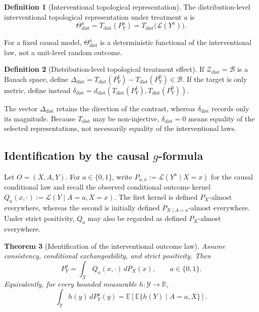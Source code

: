 \documentclass[11pt,a4paper]{article}
\theoremstyle{plain}
\newtheorem{theorem}{Theorem}[section]
\theoremstyle{definition}
\newtheorem{definition}[theorem]{Definition}
\theoremstyle{remark}
\newcommand{\1}{\mathbbm{1}}
\begin{document}
\begin{definition}[Interventional topological representation]
\label{def:interventional-topological-representation}
The distribution-level interventional topological representation under treatment \(a\) is
\[
\Theta_{\mathrm{dist}}^a
=
T_{\mathrm{dist}}(P_Y^a)
=
T_{\mathrm{dist}}\bigl(\mathcal L(Y^a)\bigr).
\]
\end{definition}

For a fixed causal model, \(\Theta_{\mathrm{dist}}^a\) is a deterministic functional of the interventional law, not a unit-level random outcome.

\begin{definition}[Distribution-level topological treatment effect]
\label{def:distribution-level-effect}
If \(\mathcal Z_{\mathrm{dist}}=\mathcal B\) is a Banach space, define
\(\Delta_{\mathrm{dist}} = T_{\mathrm{dist}}(P_Y^1)
- T_{\mathrm{dist}}(P_Y^0) \in\mathcal B\). If the target is only metric, define instead
\(\delta_{\mathrm{dist}} = d_{\mathrm{dist}}\!\left(
T_{\mathrm{dist}}(P_Y^1), T_{\mathrm{dist}}(P_Y^0)
\right)\).
\end{definition}

The vector \(\Delta_{\mathrm{dist}}\) retains the direction of the contrast, whereas \(\delta_{\mathrm{dist}}\) records only its magnitude. Because \(T_{\mathrm{dist}}\) may be non-injective, \(\delta_{\mathrm{dist}}=0\) means equality of the selected representations, not necessarily equality of the interventional laws.

\subsection{Identification by the causal
\texorpdfstring{\(g\)}{g}-formula}
\label{subsec:distribution-identification}

Let \(O=(X,A,Y)\). For \(a\in\{0,1\}\), write
\(P_{a,x} := \mathcal L(Y^a\mid X=x)\) for the causal conditional law and recall the observed conditional
outcome kernel \(Q_a(x,\cdot) := \mathcal L(Y\mid A=a,X=x)\). The first kernel is defined \(P_X\)-almost everywhere, whereas the second is initially defined \(P_{X\mid A=a}\)-almost everywhere. Under strict positivity, \(Q_a\) may also be regarded as defined \(P_X\)-almost everywhere.

\begin{theorem}[Identification of the interventional outcome law]
\label{thm:identification-interventional-law}
Assume consistency, conditional exchangeability, and strict positivity. Then
\[
P_Y^a
=
\int_{\mathcal X}Q_a(x,\cdot)\,dP_X(x),
\qquad a\in\{0,1\}.
\]
Equivalently, for every bounded measurable
\(h:\mathcal Y\to\mathbb R\),
\[
\int_{\mathcal Y}h(y)\,dP_Y^a(y)
=
\mathbb E\left[
\mathbb E\{h(Y)\mid A=a,X\}
\right].
\]
\end{theorem}
\end{document}
